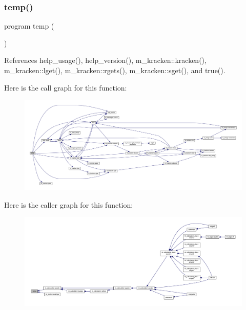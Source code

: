 \subsubsection{\texorpdfstring{temp()}{temp()}}
{\footnotesize\ttfamily program temp (\begin{DoxyParamCaption}{ }\end{DoxyParamCaption})}



References help\+\_\+usage(), help\+\_\+version(), m\+\_\+kracken\+::kracken(), m\+\_\+kracken\+::lget(), m\+\_\+kracken\+::rgets(), m\+\_\+kracken\+::sget(), and true().

Here is the call graph for this function\+:
\nopagebreak
\begin{figure}[H]
\begin{center}
\leavevmode
\includegraphics[width=350pt]{temp_8f90_ae3dd9015488975da65db0e05e1d019c3_cgraph}
\end{center}
\end{figure}
Here is the caller graph for this function\+:
\nopagebreak
\begin{figure}[H]
\begin{center}
\leavevmode
\includegraphics[width=350pt]{temp_8f90_ae3dd9015488975da65db0e05e1d019c3_icgraph}
\end{center}
\end{figure}
